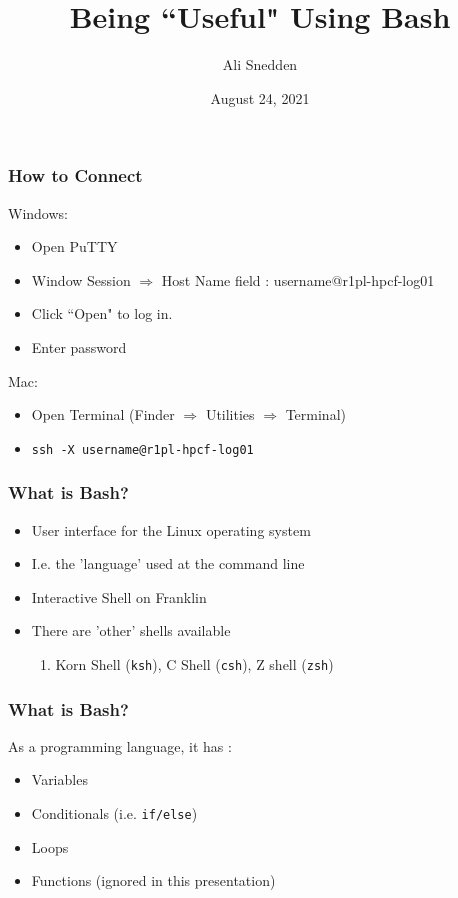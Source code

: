 \documentclass{beamer}
\title{Being ``Useful" Using Bash}
\author{Ali Snedden}
\institute{Nationwide Children's Hospital}
\date{August 24, 2021}
\newcommand{\code}[1]{\colorbox{codegray}{\texttt{#1}}}
\begin{document}
 
\frame{\titlepage}




\begin{frame}
\frametitle{How to Connect}
Windows:
\begin{itemize}
    \item Open PuTTY
    \item Window Session $\Rightarrow$ Host Name field : username@r1pl-hpcf-log01
    \item Click ``Open" to log in.
    \item Enter password
\end{itemize}

Mac:
\begin{itemize}
    \item Open Terminal (Finder $\Rightarrow$ Utilities $\Rightarrow$ Terminal)
    \item \code{ssh -X username@r1pl-hpcf-log01}
\end{itemize}
\end{frame}



\begin{frame}
\frametitle{What is Bash?}
\begin{itemize}
    \item User interface for the Linux operating system
    \pause
    \item I.e. the 'language' used at the command line
    \pause
    \item Interactive Shell on Franklin
    \pause
    \item There are 'other' shells available
    \begin{enumerate}
        \item Korn Shell (\code{ksh}), C Shell (\code{csh}), Z shell (\code{zsh})
    \end{enumerate}
\end{itemize}
\end{frame}


\begin{frame}
\frametitle{What is Bash?}
As a programming language, it has :
\begin{itemize}
    \item Variables 
    \pause
    \item Conditionals (i.e. \code{if/else})
    \pause
    \item Loops 
    \pause
    \item Functions (ignored in this presentation)
\end{itemize}
\end{frame}
\end{document}

